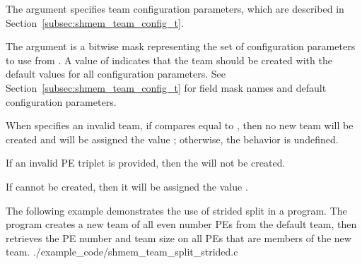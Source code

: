 \begin{apidefinition}
{The  argument specifies team configuration parameters, which are
described in Section~\ref{subsec:shmem_team_config_t}.

The  argument is a bitwise mask representing the set of
configuration parameters to use from .
A  value of  indicates that the team
should be created with the default values for all configuration parameters.
See Section~\ref{subsec:shmem_team_config_t} for field mask names and
default configuration parameters.

When  specifies an invalid team, if 
compares equal to , then no new team
will be created and  will be assigned the value
; otherwise, the behavior is undefined.

If an invalid \ac{PE} triplet is provided, then the  will not be created.

If  cannot be created, then it will be assigned the value
.
}



\begin{apiexamples}

    \apicexample
    {The following example demonstrates the use of strided split in a
    \Cstd[11] program. The program creates a new team of all even number
    \acp{PE} from the default team, then retrieves the \ac{PE} number and
    team size on all \acp{PE} that are members of the new team.}
    {./example_code/shmem_team_split_strided.c}
    {}

\end{apiexamples}

\end{apidefinition}
